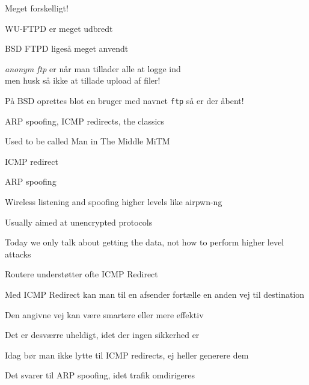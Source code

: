 \documentclass[Screen16to9,17pt]{foils}
\begin{document}

\begin{list1}
\item Meget forskelligt!
\item WU-FTPD er meget udbredt
\item BSD FTPD ligeså meget anvendt
\item \emph{anonym ftp} er når man tillader alle at logge ind\\
men husk så ikke at tillade upload af filer!
\item På BSD oprettes blot en bruger med navnet \verb+ftp+ så er der åbent!
\end{list1}





\begin{list1}
\item ARP spoofing, ICMP redirects, the classics
\item Used to be called Man in The Middle MiTM
\begin{list2}
\item ICMP redirect
\item ARP spoofing
\item Wireless listening and spoofing higher levels like  airpwn-ng 
\end{list2}
\item Usually aimed at unencrypted protocols
\item Today we only talk about getting the data, not how to perform higher level attacks
\end{list1}



\begin{list1}
\item Routere understøtter ofte ICMP Redirect
\item Med ICMP Redirect kan man til en afsender fortælle en anden vej til destination
\item Den angivne vej kan være smartere eller mere effektiv
\item Det er desværre uheldigt, idet der ingen sikkerhed er
\item Idag bør man ikke lytte til ICMP redirects, ej heller generere dem
\item Det svarer til ARP spoofing, idet trafik omdirigeres
\end{list1}
\end{document}
